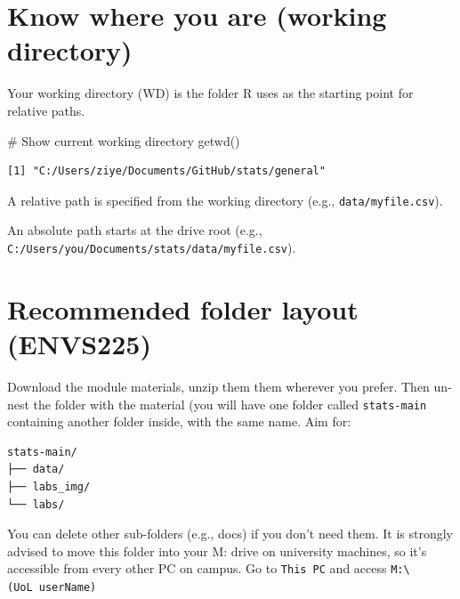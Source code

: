 \documentclass[
  letterpaper,
  DIV=11,
  numbers=noendperiod]{scrreprt}
\newenvironment{Shaded}{\begin{snugshade}}{\end{snugshade}}
\newcommand{\CommentTok}[1]{\textcolor[rgb]{0.37,0.37,0.37}{#1}}
\newcommand{\FunctionTok}[1]{\textcolor[rgb]{0.28,0.35,0.67}{#1}}
\newcommand{\NormalTok}[1]{\textcolor[rgb]{0.00,0.23,0.31}{#1}}
\begin{document}
\section*{Know where you are (working
directory)}\label{know-where-you-are-working-directory}


Your working directory (WD) is the folder R uses as the starting point
for relative paths.

\begin{Shaded}
\begin{Highlighting}[]
\CommentTok{\# Show current working directory}
\FunctionTok{getwd}\NormalTok{()}
\end{Highlighting}
\end{Shaded}

\begin{verbatim}
[1] "C:/Users/ziye/Documents/GitHub/stats/general"
\end{verbatim}

A relative path is specified from the working directory (e.g.,
\texttt{data/myfile.csv}).

An absolute path starts at the drive root (e.g.,
\texttt{C:/Users/you/Documents/stats/data/myfile.csv}).

\section*{Recommended folder layout
(ENVS225)}\label{recommended-folder-layout-envs225}


Download the module materials, unzip them them wherever you prefer. Then
un-nest the folder with the material (you will have one folder called
\texttt{stats-main} containing another folder inside, with the same
name. Aim for:

\begin{verbatim}
stats-main/
├── data/
├── labs_img/
└── labs/
\end{verbatim}

You can delete other sub-folders (e.g., docs) if you don't need them. It
is strongly advised to move this folder into your M: drive on university
machines, so it's accessible from every other PC on campus. Go to
\texttt{This\ PC} and access \texttt{M:\textbackslash{}(UoL\ userName)}
\end{document}

